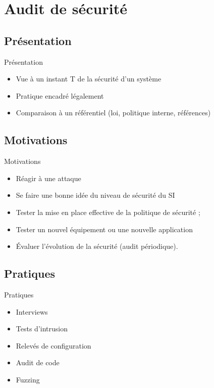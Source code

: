 \documentclass{beamer}
\begin{document}
\begin{comment}
	Justement, si au lieu de faire une présentation sur Secu Web et audit, on faisait plutot, audit de sécurité d'une application web. 
	On a ton site (le truc .co.uk), on suppose que c'est notre "client", et nous notre role s'est de faire justement l'audit de sécurité de ce site. Et donc dès qu'on arrive a la partie Execution de l'audit, on explique donc les vulnérabilités web connus (les trucs de l'owasp) et on fait les démos directement sur ce site de notre "client" en expliquant les outils utilisés etc..

	Donc en quelque sorte ca sera un exposé/démonstration en situation pseudo réelle.
	

\end{comment}

\section{Audit de sécurité}
	\subsection{Présentation}
	\begin{frame}{Présentation}
		\begin{itemize}
			\item Vue à un instant T de la sécurité d'un système
			\item Pratique encadré légalement
			\item Comparaison à un référentiel (loi, politique interne, références)
		\end{itemize}
	\end{frame}
	\subsection{Motivations}
	\begin{frame}{Motivations}
		\begin{itemize}
			\item Réagir à une attaque
			\item Se faire une bonne idée du niveau de sécurité du SI
			\item Tester la mise en place effective de la politique de sécurité ;
			\item Tester un nouvel équipement ou une nouvelle application
			\item Évaluer l'évolution de la sécurité (audit périodique).
		\end{itemize}
	\end{frame}
	\subsection{Pratiques}
	\begin{frame}{Pratiques}
		\begin{itemize}
			\item Interviews
			\item Tests d'intrusion
			\item Relevés de configuration
			\item Audit de code
			\item Fuzzing
		\end{itemize}
	\end{frame}
\end{document}
